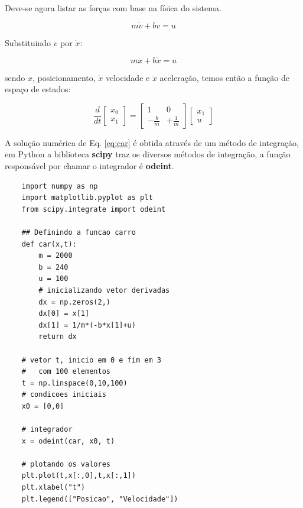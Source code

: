 Deve-se agora listar as forças com base na física do sistema.

\begin{equation*}
    m\dot{v}+bv=u
\end{equation*}

Substituindo $v$ por $\dot{x}$:

\begin{equation*}
    m\ddot{x}+b\dot{x}=u
\end{equation*}

sendo $x$, posicionamento, $\dot{x}$ velocidade e $\ddot{x}$ aceleração, temos então a função de espaço de estados:

\begin{equation}\label{eq:car}
    \frac{d}{dt}\begin{bmatrix} x_0 \\ x_1 \end{bmatrix} = 
    \begin{bmatrix} 1 & 0\\ -\displaystyle\frac{b}{m} & +\displaystyle\frac{1}{m} \end{bmatrix}
    \begin{bmatrix} x_1 \\ u \end{bmatrix}    
\end{equation}

A solução numérica de Eq. \ref{eq:car} é obtida através de um método de integração, em Python a biblioteca \textbf{scipy} traz os diversos métodos de integração, a função responsável por chamar o integrador é \textbf{odeint}.

\begin{lstlisting}
    import numpy as np
    import matplotlib.pyplot as plt
    from scipy.integrate import odeint

    ## Definindo a funcao carro
    def car(x,t):
        m = 2000
        b = 240
        u = 100
        # inicializando vetor derivadas
        dx = np.zeros(2,)
        dx[0] = x[1]
        dx[1] = 1/m*(-b*x[1]+u)
        return dx

    # vetor t, inicio em 0 e fim em 3
    #   com 100 elementos
    t = np.linspace(0,10,100)
    # condicoes iniciais
    x0 = [0,0]

    # integrador
    x = odeint(car, x0, t)

    # plotando os valores
    plt.plot(t,x[:,0],t,x[:,1])
    plt.xlabel("t")
    plt.legend(["Posicao", "Velocidade"]) 
\end{lstlisting}
 
